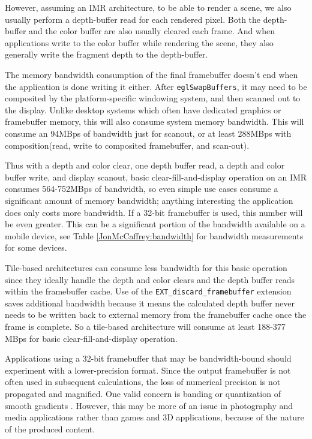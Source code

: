  

However, assuming an IMR architecture, to be able to render a scene, we also
usually perform a depth-buffer read for each rendered pixel.  Both the
depth-buffer and the color buffer are also usually cleared each frame.  And
when applications write to the color buffer while rendering the scene, they
also generally write the fragment depth to the depth-buffer.

The memory bandwidth consumption of the final framebuffer doesn't end when the
application is done writing it either.  After \texttt{eglSwapBuffers}, it may
need to be composited by the platform-specific windowing system, and then
scanned out to the display.  Unlike desktop systems which often have
dedicated graphics or framebuffer memory, this will also consume system memory
bandwidth.  This will consume an 94MBps of bandwidth just for
scanout, or at least 288MBps with composition(read, write to
composited framebuffer, and scan-out).


 Thus with a depth and color clear, one depth buffer read, a depth and color
 buffer write, and display scanout, basic clear-fill-and-display operation on an IMR
 consumes 564-752MBps of bandwidth, so even simple use cases consume a
 significant amount of memory bandwidth; anything interesting the application
 does only costs more bandwidth. If a 32-bit framebuffer is used, this number
 will be even greater.  This can be a significant portion of the bandwidth available on a mobile device, see Table \ref{JonMcCaffrey:bandwidth} for bandwidth
 measurements for some devices.

 Tile-based architectures can consume less bandwidth for this basic operation
 since they ideally handle the depth and color clears and the depth buffer
 reads within the framebuffer cache.  Use of the
 \texttt{EXT\_discard\_framebuffer} \cite{EXT_discard_framebuffer} extension
 saves
 additional bandwidth because it means the calculated depth buffer
 never needs
 to be written back to external memory from the framebuffer cache
 once the
 frame is complete. So a tile-based architecture will consume at
 least 188-377
 MBps for basic clear-fill-and-display operation.


Applications using a 32-bit framebuffer that may be bandwidth-bound should
experiment with a lower-precision format.  Since the output framebuffer is not
often used in subsequent calculations, the loss of numerical precision is not
propagated and magnified.  One valid concern is banding or quantization of
smooth gradients \cite{Guy10}.  However, this may be more of an issue in
photography and media applications rather than games and 3D applications,
because of the nature of the produced content.


